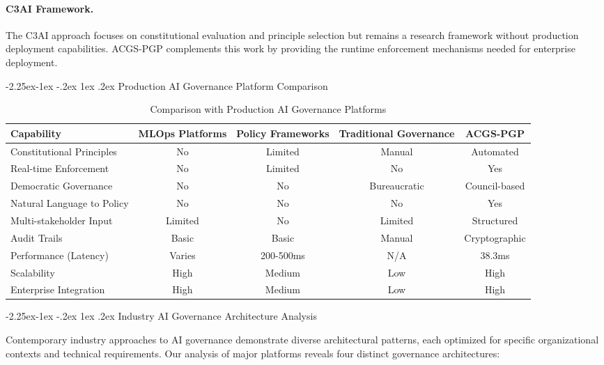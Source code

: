 \documentclass[manuscript,screen,9pt]{acmart}
\makeatletter
\renewcommand\subsection{\@startsection{subsection}{2}{\z@}%
  {-2.25ex\@plus -1ex \@minus -.2ex}%
  {1ex \@plus .2ex}%
  {\normalfont\large\bfseries}}
\newcommand{\tablesize}{\footnotesize}
\makeatother
\begin{document}
\begin{table}[!htb]
\paragraph{C3AI Framework.} The C3AI approach \citep{C3AI2025Framework} focuses on constitutional evaluation and principle selection but remains a research framework without production deployment capabilities. ACGS-PGP complements this work by providing the runtime enforcement mechanisms needed for enterprise deployment.

\subsection{Production AI Governance Platform Comparison}

\begin{table}[ht]
\centering
\caption{Comparison with Production AI Governance Platforms}
\label{tab:production_comparison}
\tablesize
\begin{tabular}{@{}lcccc@{}}
\toprule
\textbf{Capability} & \textbf{MLOps Platforms} & \textbf{Policy Frameworks} & \textbf{Traditional Governance} & \textbf{ACGS-PGP} \\
\midrule
Constitutional Principles & No & Limited & Manual & Automated \\
Real-time Enforcement & No & Limited & No & Yes \\
Democratic Governance & No & No & Bureaucratic & Council-based \\
Natural Language to Policy & No & No & No & Yes \\
Multi-stakeholder Input & Limited & No & Limited & Structured \\
Audit Trails & Basic & Basic & Manual & Cryptographic \\
Performance (Latency) & Varies & 200-500ms & N/A & 38.3ms \\
Scalability & High & Medium & Low & High \\
Enterprise Integration & High & Medium & Low & High \\
\bottomrule
\end{tabular}
\end{table}

\subsection{Industry AI Governance Architecture Analysis}
\label{subsec:industry_architecture_analysis}

Contemporary industry approaches to AI governance demonstrate diverse architectural patterns, each optimized for specific organizational contexts and technical requirements. Our analysis of major platforms reveals four distinct governance architectures:


\end{table}
\end{document}

